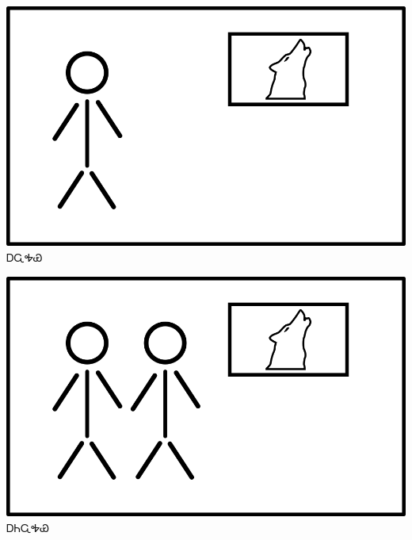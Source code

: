 \documentclass[avery8371]{flashcards}%
\begin{document}
     \begin{flashcard}{
        \includegraphics[width=0.95\columnwidth,height=.51\columnwidth,keepaspectratio]{../artwork/flags/awahaya-flag}
    }
        \Huge ᎠᏩᎭᏯ
    \end{flashcard}
    \begin{flashcard}{
        \includegraphics[width=0.95\columnwidth,height=.51\columnwidth,keepaspectratio]{../artwork/flags/aniwahaya-flag}
    }
        \Huge ᎠᏂᏩᎭᏯ
    \end{flashcard}
\end{document}
